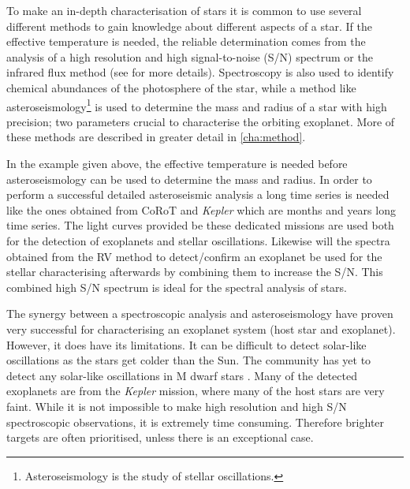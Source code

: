 To make an in-depth characterisation of stars it is common to use several different methods to gain
knowledge about different aspects of a star. If the effective temperature is needed, the reliable
determination comes from the analysis of a high resolution and high signal-to-noise (S/N) spectrum
or the infrared flux method (see  for more details). Spectroscopy is also used to
identify chemical abundances of the photosphere of the star, while a method like
asteroseismology\footnote{Asteroseismology is the study of stellar oscillations.} is used to
determine the mass and radius of a star with high precision; two parameters crucial to characterise
the orbiting exoplanet. More of these methods are described in greater detail in \cref{cha:method}.

In the example given above, the effective temperature is needed before asteroseismology can be used
to determine the mass and radius. In order to perform a successful detailed asteroseismic analysis
a long time series is needed like the ones obtained from CoRoT and \emph{Kepler} which are months
and years long time series. The light curves provided be these dedicated missions are used both for
the detection of exoplanets and stellar oscillations. Likewise will the spectra obtained from the RV
method to detect/confirm an exoplanet be used for the stellar characterising afterwards by combining
them to increase the S/N. This combined high S/N spectrum is ideal for the spectral analysis of
stars.

The synergy between a spectroscopic analysis and asteroseismology have proven very successful
\citep[see e.g.][]{Huber2013} for characterising an exoplanet system (host star and exoplanet).
However, it does have its limitations. It can be difficult to detect solar-like oscillations as the
stars get colder than the Sun. The community has yet to detect any solar-like oscillations in M
dwarf stars \citep{Rodriguez2016,Berdinas2017}. Many of the detected exoplanets are from the
\emph{Kepler} mission, where many of the host stars are very faint. While it is not impossible to
make high resolution and high S/N spectroscopic observations, it is extremely time consuming.
Therefore brighter targets are often prioritised, unless there is an exceptional case.

